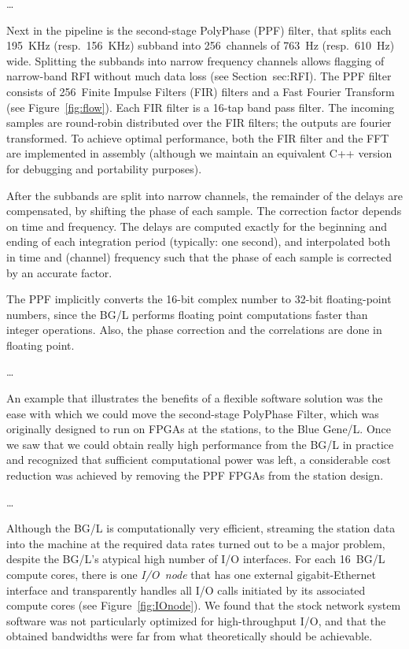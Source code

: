 \documentclass[journal]{IEEEtran}
\begin{document}
\ldots

Next in the pipeline is the second-stage PolyPhase (PPF) filter, that splits
each 195~KHz (resp.\ 156~KHz) subband into 256~channels of 763~Hz
(resp.\ 610~Hz) wide.
Splitting the subbands into narrow frequency channels allows flagging
of narrow-band RFI without much data loss (see Section~{sec:RFI}).
The PPF filter consists of 256~Finite Impulse Filters (FIR) filters and a
Fast Fourier Transform (see Figure~\ref{fig:flow}).
Each FIR filter is a 16-tap band pass filter.
The incoming samples are round-robin distributed over the FIR filters;
the outputs are fourier transformed.
To achieve optimal performance, both the FIR filter and the FFT are implemented
in assembly (although we maintain an equivalent C++ version for debugging
and portability purposes).

After the subbands are split into narrow channels, the remainder of the
delays are compensated, by shifting the phase of each sample.
The correction factor depends on time and frequency.
The delays are computed exactly for the beginning and ending of each
integration period (typically: one second), and interpolated both in time
and (channel) frequency such that the phase of each sample is corrected by
an accurate factor.



The PPF implicitly converts the 16-bit complex number to 32-bit floating-point
numbers, since the BG/L performs floating point computations faster than
integer operations.
Also, the phase correction and the correlations are done in floating point.



\ldots

An example that illustrates the benefits of a flexible software solution was
the ease with which we could move the second-stage PolyPhase Filter, which was
originally designed to run on FPGAs at the stations, to the Blue Gene/L.
Once we saw that we could obtain really high performance from the BG/L in
practice and recognized that sufficient computational power was left,
a considerable cost reduction was achieved by removing the PPF FPGAs from the
station design.

\ldots

Although the BG/L is computationally very efficient,
streaming the station data into the machine at the required data rates
turned out to be a major problem,
despite the BG/L's atypical high number of I/O interfaces.
For each 16~BG/L compute cores, there is one {\em I/O~node\/} that
has one external gigabit-Ethernet interface and transparently handles all I/O
calls initiated by its associated compute cores (see Figure~\ref{fig:IOnode}).
We found that the stock network system software was not particularly optimized
for high-throughput I/O, and that the obtained bandwidths were far from what
theoretically should be achievable.
\end{document}

